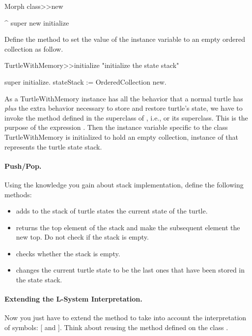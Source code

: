 \begin{method}
Morph class>>new

	^ super new initialize
\end{method}

Define the method  to set the value of  the instance variable
 to an empty ordered collection as follow.

\begin{method}
TurtleWithMemory>>initialize
   "initialize the state stack"
   
   super initialize.
   stateStack := OrderedCollection new.
\end{method}

As a TurtleWithMemory instance has all the behavior that a normal
turtle has \emph{plus} the extra behavior necessary to store and
restore turtle's state, we have to invoke the  method
defined in the superclass of , i.e.,
 or its superclass. This is the purpose of the expression .  Then the instance variable specific to the class
TurtleWithMemory is initialized to hold an empty collection, instance
of  that represents the turtle state stack.


\paragraph{Push/Pop.}
Using the knowledge you gain about stack implementation, define the
following methods:
\begin{itemize}
\item {} adds to the stack of turtle states the current state of
 the turtle. 
\item {} returns the top element of the stack and make the
 subsequent element the new top. Do not check if the stack is empty. 
\item {} checks whether the stack is empty.
\item {} changes the current turtle state to be the last ones that have been stored in the state stack.
\end{itemize}

\paragraph{Extending the L-System Interpretation.}
Now you just have to extend the method  to take into account the interpretation of
symbols: [ and ]. Think about reusing the method
 defined on the class
.


